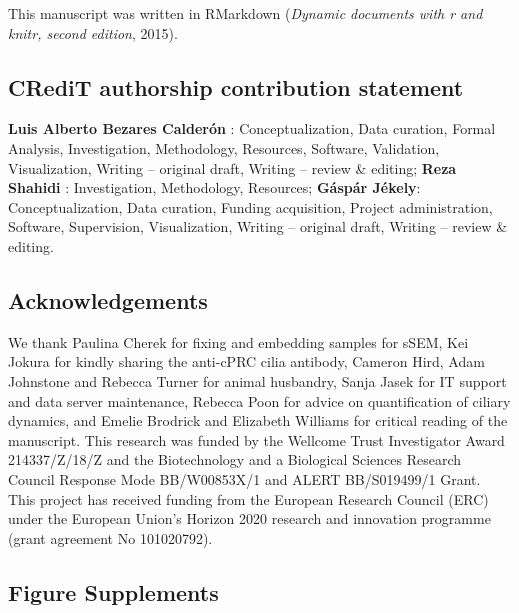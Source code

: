 \documentclass[
  11pt,
]{article}
\begin{document}
This manuscript was written in RMarkdown (\emph{Dynamic documents with r
and knitr, second edition}, 2015).

\subsection{CRediT authorship contribution
statement}\label{credit-authorship-contribution-statement}

\textbf{Luis Alberto Bezares Calderón} : Conceptualization, Data
curation, Formal Analysis, Investigation, Methodology, Resources,
Software, Validation, Visualization, Writing -- original draft, Writing
-- review \& editing; \textbf{Reza Shahidi} : Investigation,
Methodology, Resources; \textbf{Gáspár Jékely}: Conceptualization, Data
curation, Funding acquisition, Project administration, Software,
Supervision, Visualization, Writing -- original draft, Writing -- review
\& editing.

\subsection{Acknowledgements}\label{acknowledgements}

We thank Paulina Cherek for fixing and embedding samples for sSEM, Kei
Jokura for kindly sharing the anti-cPRC cilia antibody, Cameron Hird,
Adam Johnstone and Rebecca Turner for animal husbandry, Sanja Jasek for
IT support and data server maintenance, Rebecca Poon for advice on
quantification of ciliary dynamics, and Emelie Brodrick and Elizabeth
Williams for critical reading of the manuscript. This research was
funded by the Wellcome Trust Investigator Award 214337/Z/18/Z and the
Biotechnology and a Biological Sciences Research Council Response Mode
BB/W00853X/1 and ALERT BB/S019499/1 Grant. This project has received
funding from the European Research Council (ERC) under the European
Union's Horizon 2020 research and innovation programme (grant agreement
No 101020792).

\subsection{Figure Supplements}\label{figure-supplements}
\end{document}
